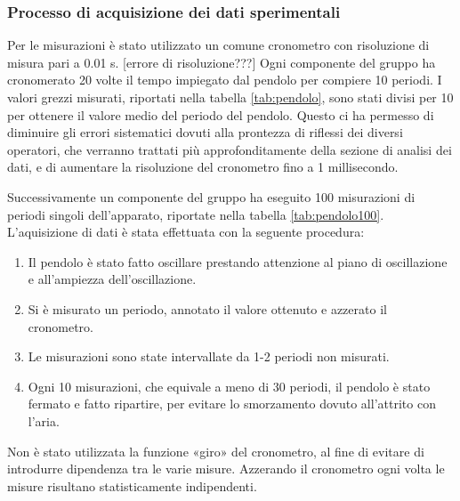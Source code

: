 \subsubsection{Processo di acquisizione dei dati sperimentali}

Per le misurazioni è stato utilizzato un comune cronometro con risoluzione di
misura pari a 0.01 s. [errore di risoluzione???] Ogni componente del gruppo ha
cronomerato 20 volte il tempo impiegato dal pendolo per compiere 10 periodi.
I valori grezzi misurati, riportati nella tabella \ref{tab:pendolo}, sono stati divisi per
10 per ottenere il valore medio del periodo del pendolo. Questo ci ha permesso
di diminuire gli errori sistematici dovuti alla prontezza di riflessi dei diversi
operatori, che verranno trattati più approfonditamente della sezione di analisi dei
dati, e di aumentare la risoluzione del cronometro fino a 1 millisecondo.

Successivamente un componente del gruppo ha eseguito 100 misurazioni di periodi
singoli dell'apparato, riportate nella tabella \ref{tab:pendolo100}. L'aquisizione di dati è stata
effettuata con la seguente procedura:

\begin{enumerate}
    \item{Il pendolo è stato fatto oscillare prestando attenzione al piano di oscillazione
        e all'ampiezza dell'oscillazione.}

    \item{Si è misurato un periodo, annotato il valore ottenuto e azzerato il cronometro.}

    \item{Le misurazioni sono state intervallate da 1-2 periodi non misurati.}

    \item{Ogni 10 misurazioni, che equivale a meno di 30 periodi, il pendolo è stato fermato
        e fatto ripartire, per evitare lo smorzamento dovuto all'attrito con l'aria.}
\end{enumerate}

Non è stato utilizzata la funzione «giro» del cronometro, al fine di evitare
di introdurre dipendenza tra le varie misure. Azzerando il cronometro ogni 
volta le misure risultano statisticamente indipendenti.

